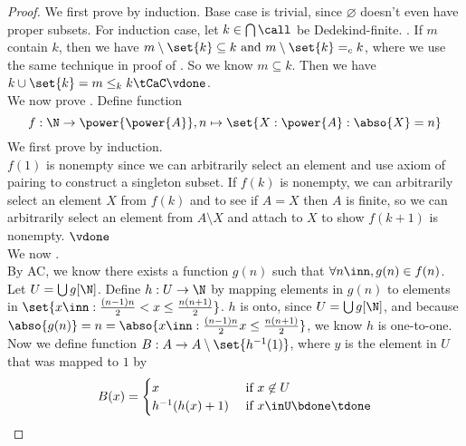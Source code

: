 \documentclass{report}
\begin{document}
\begin{proof}
We first prove  by induction. Base case is trivial, since $\varnothing$ doesn't even have  proper subsets. For induction case, let $k\in \bigcap \call $ be Dedekind-finite. . If $m$ contain  $k$, then we have  $m\setminus \set{k}\subseteq k\text{ and }m\setminus \set{k}=_c k$, where we use the same technique in proof of . So we know $m\subseteq k$. Then we have $k\cup \set{k}=m\leq_k k\tCaC\vdone$.\\

We now prove . Define function 
\begin{equation*}
f:\N\rightarrow \power{\power{A}}, n\mapsto \set{X:\power{A}:\abso{X}=n}
\end{equation*}
We first prove  by induction.\\

$f(1)$ is nonempty since we can arbitrarily select an element and use axiom of pairing to construct a singleton subset. If $f(k)$ is nonempty, we can arbitrarily select an element $X$ from $f(k)$ and to see if $A=X$ then $A$ is finite, so we can arbitrarily select an element from $A\setminus X$ and attach to $X$ to show  $f(k+1)$ is nonempty.  $\vdone$\\

We now .\\

By AC, we know there exists a function $g(n)$ such that $\forall n\inn, g(n)\in f(n)$. Let $U=\bigcup g[\N]$. Define $h:U\rightarrow \N$ by mapping elements in $g(n)$ to elements in $\set{x \inn: \frac{(n-1)n}{2}<x\leq \frac{n(n+1)}{2}}$. $h$ is onto, since  $U=\bigcup g[\N]$, and because $\abso{g(n)}=n=\abso{x\inn:\frac{(n-1)n}{2}x\leq \frac{n(n+1)}{2}}$, we know $h$ is one-to-one. Now we define function $B:A\rightarrow A\setminus \set{h^{-1}(1)}$, where $y$ is the element in  $U$ that was mapped to  $1$ by
\begin{equation*}
B(x)=\begin{cases}
  x& \text{ if  }x\not\in U\\
  h^{-1}(h(x)+1)& \text{ if  }x\inU\bdone\tdone
\end{cases}
\end{equation*}
\end{proof}
\end{document}
